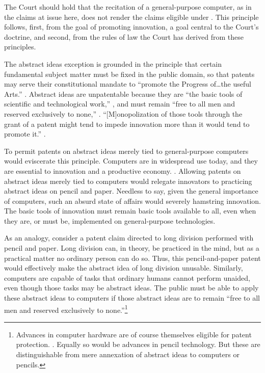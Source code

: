 \documentclass{scotus}
\begin{document}
The Court should hold that the recitation of a
general-purpose computer, as in the claims at issue here, does not render the
claims eligible under .
This principle follows, first, from the goal of promoting innovation, a goal
central to
the Court's  doctrine, and second, from the rules of law
the Court has derived from these principles.

The abstract ideas exception is grounded in the principle that certain
fundamental subject matter must be fixed in the public domain, so that
patents may serve their constitutional mandate to ``promote the Progress
of\ldots the useful Arts.'' .
Abstract ideas are unpatentable because they
are ``the basic tools of scientific and technological work,'' , and must remain ``free to all men and reserved exclusively to none,''
. ``[M]onopolization
of those tools through the grant of a patent might tend to impede innovation
more than it would tend to promote it.'' .

To permit patents on abstract ideas merely tied to general-purpose computers
would eviscerate this principle.
Computers are in
widespread use today, and they are essential to innovation and a productive
economy. . 
Allowing patents on abstract ideas merely tied to computers
would relegate
innovators to practicing abstract ideas on pencil and
paper. Needless to say, given the general importance of computers, such an
absurd state of affairs would severely hamstring innovation.
The basic tools of innovation must remain basic tools available to all, even
when they are, or must be, implemented on general-purpose technologies.

As an analogy, consider a patent claim directed to long division performed with
pencil and paper. Long division can, in theory, be practiced in the mind, but
as a practical matter no ordinary person can do so. Thus, this pencil-and-paper
patent would effectively make the abstract idea of long division unusable.
Similarly, computers are capable of tasks that ordinary
humans cannot perform unaided, even though those tasks may be
abstract ideas. The public must be able to apply these abstract ideas to
computers if those abstract ideas are to
remain ``free to all men and reserved exclusively to none.''\footnote{%
Advances in computer hardware are of course themselves eligible for patent
protection.  . Equally so would be advances in pencil technology. But these are
distinguishable from mere annexation of abstract ideas to computers or pencils.}
\end{document}
